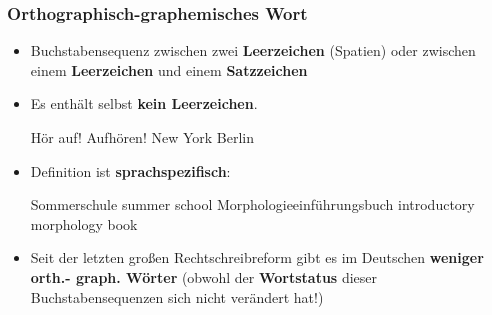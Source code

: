 \begin{frame}
\frametitle{Orthographisch-graphemisches Wort}

\begin{itemize}
	\item Buchstabensequenz zwischen zwei \textbf{Leerzeichen} (Spatien) oder zwischen einem \textbf{Leerzeichen} und einem \textbf{Satzzeichen}

\pause 

	\item Es enthält selbst \textbf{kein Leerzeichen}.
	
	\ea Hör auf! \vs Aufhören!
	\ex New York \vs Berlin
	\z 

	\item Definition ist \textbf{sprachspezifisch}:
	
	\ea Sommerschule \vs summer school
	\ex Morphologieeinführungsbuch \vs introductory morphology book
	\z 
	
\pause 

	\item Seit der letzten großen Rechtschreibreform gibt es im Deutschen \textbf{weniger orth.-
graph. Wörter} (obwohl der \textbf{Wortstatus} dieser Buchstabensequenzen sich nicht verändert hat!)
	
		\ea {} \ras {} 
		\z 
		
\end{itemize}

\end{frame}


